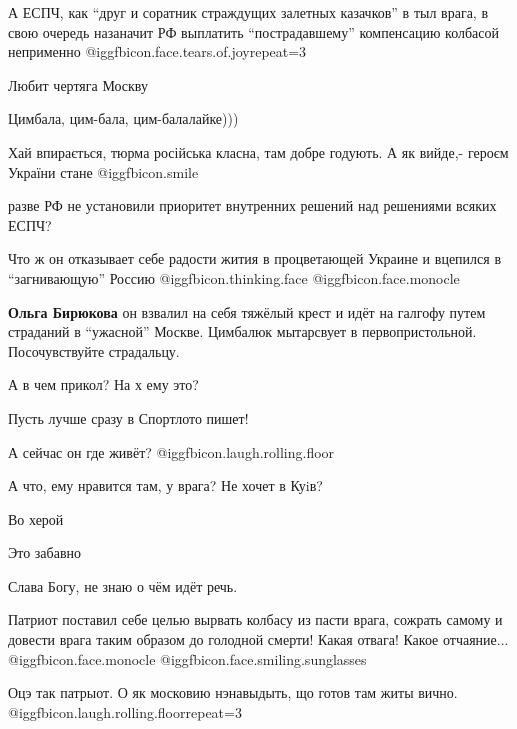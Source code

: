 \begin{itemize}

А ЕСПЧ, как \enquote{друг и соратник страждущих залетных казачков} в тыл врага, в свою
очередь назаначит РФ выплатить \enquote{пострадавшему} компенсацию колбасой
неприменно @igg{fbicon.face.tears.of.joy}{repeat=3} 


Любит чертяга Москву

Цимбала, цим-бала, цим-балалайке)))

Хай впирається, тюрма російська класна, там добре годують.
А як вийде,- героєм України стане  @igg{fbicon.smile} 

разве РФ не установили приоритет внутренних решений над решениями всяких ЕСПЧ?


Что ж он отказывает себе радости жития в процветающей Украине и вцепился в
\enquote{загнивающую} Россию @igg{fbicon.thinking.face}  @igg{fbicon.face.monocle} 

\begin{itemize} %
\textbf{Ольга Бирюкова} он взвалил на себя тяжёлый крест и идёт на галгофу путем страданий в \enquote{ужасной} Москве. Цимбалюк
мытарсвует в первопристольной. Посочувствуйте страдальцу.
\end{itemize} %

А в чем прикол? На х ему это?

Пусть лучше сразу в Спортлото пишет!

А сейчас он где живёт? @igg{fbicon.laugh.rolling.floor} 

А что, ему нравится там, у врага? Не хочет в Куiв?

Во херой

Это забавно

Слава Богу, не знаю о чём идёт речь.


Патриот поставил себе целью вырвать колбасу из пасти врага, сожрать самому и
довести врага таким образом до голодной смерти! Какая отвага! Какое
отчаяние... @igg{fbicon.face.monocle}  @igg{fbicon.face.smiling.sunglasses} 


Оцэ так патрыот. О як московию нэнавыдыть, що готов там житы вично. @igg{fbicon.laugh.rolling.floor}{repeat=3} 


\end{itemize}

